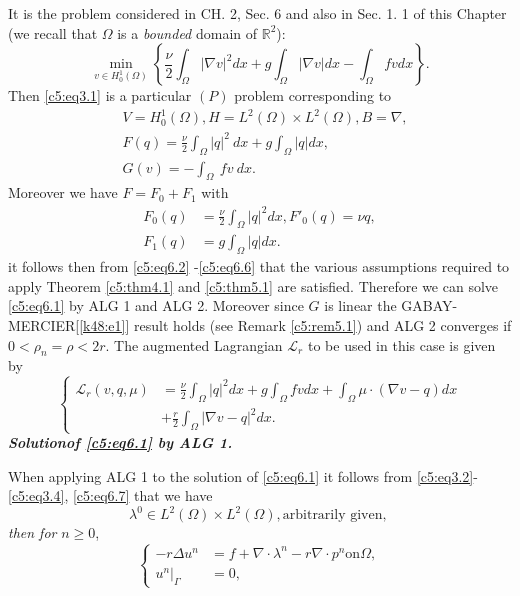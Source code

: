 It is the problem considered in CH. 2,  Sec. 6 and also in Sec. 1. 1 of this Chapter (we recall that $\Omega$ is a \textit{bounded} domain of $\mathbb{R}^2$):
\begin{equation}
\min_{v \in H^1_0 (\Omega)} \left\{\frac{\nu}{2} \int_\Omega | \nabla
v |^2 dx + g \int_\Omega | \nabla v | dx - \int_\Omega fv dx
\right\}. \tag{6.1}\label{c5:eq6.1} 
\end{equation}
Then \eqref{c5:eq3.1} is a particular $(P)$ problem corresponding to 
\begin{align*}
&V = H^1_0 (\Omega),  H = L^2 (\Omega ) \times L^2 (\Omega ), B =
  \nabla, \tag{6.2}\label{c5:eq6.2}\\ 
&F (q) = \frac{\nu}{2}\int_\Omega | q |^2 ~ dx + g \int_\Omega | q |
  dx, \tag{6.3}\label{c5:eq6.3} \\ 
&G (v) = -\int_\Omega ~ fv ~ dx. \tag{6.4}\label{c5:eq6.4}
\end{align*}
Moreover we have $F = F_0 + F_1$ with 
\begin{align*}
F_0 (q) &= \frac{\nu}{2}\int_\Omega | q|^2 dx ,  F'_0 (q) = \nu q,
\tag{6.5}\label{c5:eq6.5}\\ 
F_1 (q) &=g \int_\Omega |q| dx . \tag{6.6}\label{c5:eq6.6}
\end{align*}
it follows then from \eqref{c5:eq6.2} -\eqref{c5:eq6.6} that the various assumptions required to apply 
Theorem \ref{c5:thm4.1} and \ref{c5:thm5.1} are satisfied.  Therefore we 
can solve \eqref{c5:eq6.1} by ALG 1 and ALG 2.  Moreover since $G$ is 
linear the GABAY-MERCIER[\ref{k48:e1}] result holds (see Remark \ref{c5:rem5.1}) and ALG 2  converges if $0 < \rho_n = \rho < 2r$.  The augmented  Lagrangian $\mathscr{L}_r$  to be used in this case is given by 
\begin{equation}
\begin{cases}
\mathscr{L}_r (v, q, \mu) &=\frac{\nu}{2} \int_\Omega |q|^2 dx + g \int_\Omega fv dx + \int_\Omega \mu \cdot (\nabla v-q) dx \\
&+ \frac{r}{2} \int_\Omega | \nabla v-q|^2 dx. \tag{6.7}\label{c5:eq6.7}
\end{cases}
\end{equation}
\textbf{\em Solution\pageoriginale   of \eqref{c5:eq6.1} by ALG 1.}

When applying ALG 1 to  the solution of \eqref{c5:eq6.1} it follows
from \eqref{c5:eq3.2}-\eqref{c5:eq3.4}, \eqref{c5:eq6.7} that we have  
\begin{equation}
\lambda^0 \in L^2 (\Omega) \times L^2 (\Omega), 
\text{arbitrarily given, }\tag{6.8}\label{c5:eq6.8}
\end{equation}
\textit{then for }$n\geq 0$, 
\begin{equation}
\begin{cases}
-r\Delta u^n &= f + \nabla \cdot \lambda^n - r \nabla \cdot p^n \text{on} 
\Omega, \\
u^n |_\Gamma &= 0, \tag{6.9}\label{c5:eq6.9}
\end{cases}
\end{equation}

